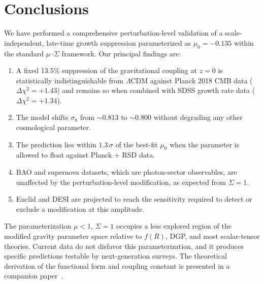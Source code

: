 \documentclass[11pt]{article}
\begin{document}
\section{Conclusions}
\label{sec:conclusions}

We have performed a comprehensive perturbation-level validation of a scale-independent, late-time growth suppression parameterized as $\mu_0 = -0.135$ within the standard $\mu$--$\Sigma$ framework.
Our principal findings are:

\begin{enumerate}
\item A fixed 13.5\% suppression of the gravitational coupling at $z = 0$ is statistically indistinguishable from $\Lambda$CDM against Planck 2018 CMB data ($\Delta\chi^2 = +1.43$) and remains so when combined with SDSS growth rate data ($\Delta\chi^2 = +1.34$).

\item The model shifts $\sigma_8$ from $\sim 0.813$ to $\sim 0.800$ without degrading any other cosmological parameter.

\item The prediction lies within $1.3\,\sigma$ of the best-fit $\mu_0$ when the parameter is allowed to float against Planck + RSD data.

\item BAO and supernova datasets, which are photon-sector observables, are unaffected by the perturbation-level modification, as expected from $\Sigma = 1$.

\item Euclid and DESI are projected to reach the sensitivity required to detect or exclude a modification at this amplitude.
\end{enumerate}

The parameterization $\mu < 1$, $\Sigma = 1$ occupies a less explored region of the modified gravity parameter space relative to $f(R)$, DGP, and most scalar-tensor theories.
Current data do not disfavor this parameterization, and it produces specific predictions testable by next-generation surveys.
The theoretical derivation of the functional form and coupling constant is presented in a companion paper~\citep{Mahaffey2026theory}.





\end{document}
